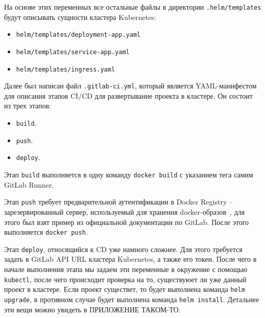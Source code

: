 На основе этих переменных все остальные файлы в директории \texttt{.helm/templates} будут описывать сущности кластера Kubernetes:

\begin{itemize}
    \item \texttt{helm/templates/deployment-app.yaml}
    \item \texttt{helm/templates/service-app.yaml}
    \item \texttt{helm/templates/ingress.yaml}
\end{itemize}

Далее был написан файл \texttt{.gitlab-ci.yml}, который является YAML-манифестом для описания этапов CI/CD для развертывание проекта в кластере. Он состоит из трех этапов:

\begin{itemize}
    \item \texttt{build}.
    \item \texttt{push}.
    \item \texttt{deploy}.
\end{itemize}

Этап \texttt{build} выполняется в одну команду \texttt{docker build} с указанием тега самим GitLab Runner.

Этап \texttt{push} требует предварительной аутентификации в Docker Registry -- зарезервированный сервер, используемый для хранения docker-образов~\cite{def:docker},
для этого был взят пример из официальной документации по GitLab. После этого выполняется \texttt{docker push}.

Этап \texttt{deploy}, относящийся к CD уже намного сложнее. Для этого требуется задать в GitLab API
URL
кластера Kubernetes, а также его токен.
После чего в начале выполнения этапа мы задаем эти переменные в окружение с помощью \texttt{kubectl},
после чего происходит проверка на то, существуюет ли уже данный проект в кластере. Если проект существет, то будет выполнена команда \texttt{helm upgrade}, в противном случае будет выполнена команда \texttt{helm install}. Детальнее эти вещи можно увидеть в ПРИЛОЖЕНИЕ ТАКОМ-ТО.
